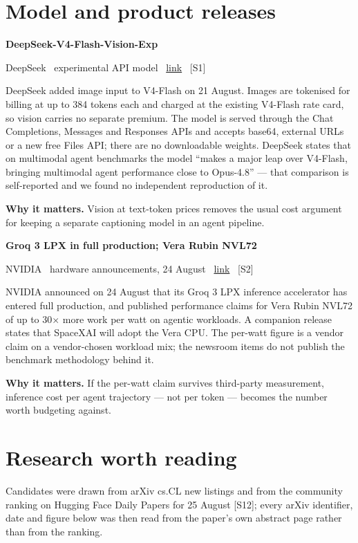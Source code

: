 \documentclass[11pt,a4paper]{article}
\newcommand{\entry}[4]{%
  \par\vspace{0.7em}%
  {\sffamily\bfseries\color{brandink}#1}\par
  {\footnotesize\color{brandgrey}#2 \textbullet\ \href{#3}{link} \textbullet\ \srcref{#4}}\par
  \vspace{0.15em}}
\newcommand{\why}[1]{\par{\small\textbf{Why it matters.} #1}\par}
\newcommand{\srcref}[1]{\textcolor{brandaccent}{[S#1]}}
\begin{document}
\section{Model and product releases}

\entry{DeepSeek-V4-Flash-Vision-Exp}{DeepSeek \textbullet\ experimental API model}{https://api-docs.deepseek.com/news/news260821}{1}
DeepSeek added image input to V4-Flash on 21 August. Images are tokenised for
billing at up to 384 tokens each and charged at the existing V4-Flash rate card,
so vision carries no separate premium. The model is served through the Chat
Completions, Messages and Responses APIs and accepts base64, external URLs or a
new free Files API; there are no downloadable weights. DeepSeek states that on
multimodal agent benchmarks the model ``makes a major leap over V4-Flash,
bringing multimodal agent performance close to Opus-4.8'' --- that comparison is
self-reported and we found no independent reproduction of it.
\why{Vision at text-token prices removes the usual cost argument for keeping a
separate captioning model in an agent pipeline.}

\entry{Groq 3 LPX in full production; Vera Rubin NVL72}{NVIDIA \textbullet\ hardware announcements, 24 August}{https://nvidianews.nvidia.com/news}{2}
NVIDIA announced on 24 August that its Groq 3 LPX inference accelerator has
entered full production, and published performance claims for Vera Rubin NVL72
of up to 30$\times$ more work per watt on agentic workloads. A companion release
states that SpaceXAI will adopt the Vera CPU. The per-watt figure is a vendor
claim on a vendor-chosen workload mix; the newsroom items do not publish the
benchmark methodology behind it.
\why{If the per-watt claim survives third-party measurement, inference cost per
agent trajectory --- not per token --- becomes the number worth budgeting against.}

\section{Research worth reading}

Candidates were drawn from arXiv cs.CL new listings and from the community
ranking on Hugging Face Daily Papers for 25 August \srcref{12}; every arXiv
identifier, date and figure below was then read from the paper's own abstract
page rather than from the ranking.
\end{document}
